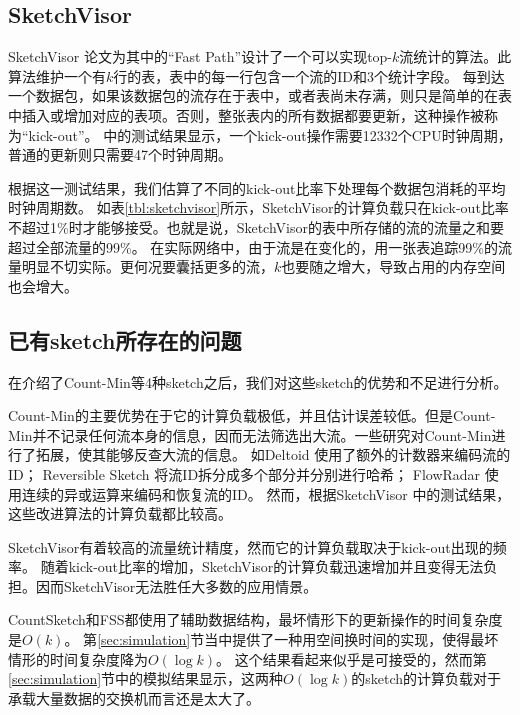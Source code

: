 \subsection{SketchVisor \cite{huang2017sketchvisor}}\label{subsec:sketchvisor}

SketchVisor \cite{huang2017sketchvisor}论文为其中的“Fast Path”设计了一个可以实现top-$k$流统计的算法。此算法维护一个有$k$行的表，表中的每一行包含一个流的ID和3个统计字段。
每到达一个数据包，如果该数据包的流存在于表中，或者表尚未存满，则只是简单的在表中插入或增加对应的表项。否则，整张表内的所有数据都要更新，这种操作被称为“kick-out”。
\cite{huang2017sketchvisor}中的测试结果显示，一个kick-out操作需要12332个CPU时钟周期，普通的更新则只需要47个时钟周期。

根据这一测试结果，我们估算了不同的kick-out比率下处理每个数据包消耗的平均时钟周期数。
如表\ref{tbl:sketchvisor}所示，SketchVisor的计算负载只在kick-out比率不超过1\%时才能够接受。也就是说，SketchVisor的表中所存储的流的流量之和要超过全部流量的99\%。
在实际网络中，由于流是在变化的，用一张表追踪99\%的流量明显不切实际。更何况要囊括更多的流，$k$也要随之增大，导致占用的内存空间也会增大。

\subsection{已有sketch所存在的问题}


在介绍了Count-Min等4种sketch之后，我们对这些sketch的优势和不足进行分析。

Count-Min的主要优势在于它的计算负载极低，并且估计误差较低。但是Count-Min并不记录任何流本身的信息，因而无法筛选出大流。一些研究对Count-Min进行了拓展，使其能够反查大流的信息。
如Deltoid \cite{cormode2005s}使用了额外的计数器来编码流的ID；
Reversible Sketch \cite{schweller2007reversible}将流ID拆分成多个部分并分别进行哈希；
FlowRadar \cite{li2016flowradar}使用连续的异或运算来编码和恢复流的ID。
然而，根据SketchVisor \cite{huang2017sketchvisor}中的测试结果，这些改进算法的计算负载都比较高。

SketchVisor有着较高的流量统计精度，然而它的计算负载取决于kick-out出现的频率。
随着kick-out比率的增加，SketchVisor的计算负载迅速增加并且变得无法负担。因而SketchVisor无法胜任大多数的应用情景。

CountSketch和FSS都使用了辅助数据结构，最坏情形下的更新操作的时间复杂度是$O(k)$。
第\ref{sec:simulation}节当中提供了一种用空间换时间的实现，使得最坏情形的时间复杂度降为$O(\log{k})$。
这个结果看起来似乎是可接受的，然而第\ref{sec:simulation}节中的模拟结果显示，这两种$O(\log{k})$的sketch的计算负载对于承载大量数据的交换机而言还是太大了。


